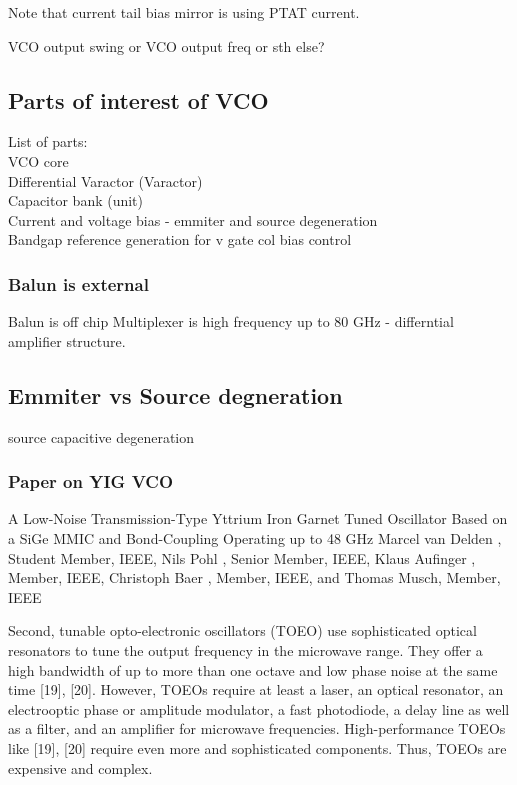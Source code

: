 \documentclass{article}
\begin{document}
Note that current tail bias mirror is using PTAT current.

\begin{question}
	VCO output swing or VCO output freq or sth else?
\end{question}


\subsection{Parts of interest of VCO}

List of parts:
\\
VCO core
\\
Differential Varactor (Varactor) %
\\
Capacitor bank (unit)
\\
Current and voltage bias - emmiter and source degeneration
\\
Bandgap reference generation for v gate col bias control 
\\

\subsubsection{Balun is external}

Balun is off chip
Multiplexer is high frequency up to 80 GHz - differntial amplifier structure.

\subsection{Emmiter vs Source degneration}

source capacitive degeneration


\subsubsection{Paper on YIG VCO}

A Low-Noise Transmission-Type Yttrium Iron Garnet Tuned Oscillator Based on a SiGe MMIC and Bond-Coupling Operating up to 48 GHz Marcel van Delden , Student Member, IEEE, Nils Pohl , Senior Member, IEEE, Klaus Aufinger , Member, IEEE, Christoph Baer , Member, IEEE, and Thomas Musch, Member, IEEE


\begin{info}
	Second, tunable opto-electronic oscillators (TOEO) use sophisticated optical resonators to tune the output frequency in the microwave range. They offer a high bandwidth of up to more than one octave and low phase noise at the same time [19], [20]. However, TOEOs require at least a laser, an optical resonator, an electrooptic phase or amplitude modulator, a fast photodiode, a delay line as well as a filter, and an amplifier for microwave frequencies. High-performance TOEOs like [19], [20] require even more and sophisticated components. Thus, TOEOs are expensive and complex.
\end{info}
\end{document}
